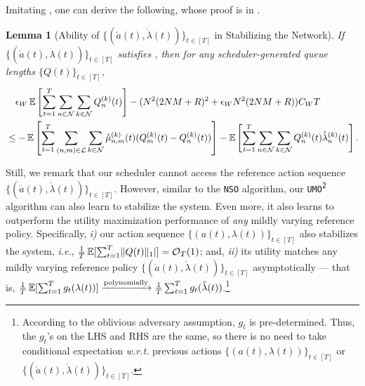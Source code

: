 \documentclass[11pt,fullpage,letterpaper]{article} %
\newtheorem{lemma}[theorem]{Lemma}
\renewcommand{\bm}[1]{#1}%
\renewcommand{\O}{\operatorname{\mathcal O}}
\newcommand{\E}{\operatornamewithlimits{\mathbb{E}}}
\newcommand{\mN}{{\mathcal N}}
\newcommand{\mL}{{\mathcal L}}
\newcommand{\SSAlg}{\texttt{NSO}\xspace}
\newcommand{\UMAlg}{\texttt{UMO}\textsuperscript{\texttt{2}}\xspace}
\begin{document}
Imitating , one can derive the following, whose proof is in .
\begin{lemma}[Ability of $\{(\mathring{\bm a}(t),\mathring{\bm \lambda}(t))\}_{t\in [T]}$ in Stabilizing the Network]\label{lem:multi-hop utility network stability}
If $\{(\mathring{\bm a}(t),\mathring{\bm \lambda}(t))\}_{t\in [T]}$ satisfies , then for any scheduler-generated queue lengths $\{\bm Q(t)\}_{t\in [T]}$,
\begin{align}
&\quad \epsilon_W \E\left [\sum_{t=1}^T \sum_{n\in \mN} \sum_{k\in \mN} Q_n^{(k)}(t)\right ] - (N^2 (2NM+R)^2 + \epsilon_W N^2 (2NM+R)) C_W T \nonumber\\
&\le-\E\left [\sum_{t=1}^T \sum_{(n,m)\in \mL}\sum_{k\in \mN} \mathring \mu_{n,m}^{(k)}(t) (Q_m^{(k)}(t) - Q_n^{(k)}(t))\right ] - \E\left [\sum_{t=1}^T \sum_{n\in \mN} \sum_{k\in \mN} Q_n^{(k)}(t) \mathring \lambda_n^{(k)}(t)\right ].\label{eq:multi-hop utility network stability}
\end{align}
\end{lemma}

Still, we remark that our scheduler cannot access the reference action sequence $\{(\mathring{\bm a}(t),\mathring{\bm \lambda}(t))\}_{t\in [T]}$. However, similar to the \SSAlg algorithm, our \UMAlg algorithm can also learn to stabilize the system.
Even more, it also learns to outperform the utility maximization performance of \textit{any} mildly varying reference policy.
Specifically, \textit{i)} our action sequence $\{(\bm a(t),\bm \lambda(t))\}_{t\in [T]}$ also stabilizes the system, \textit{i.e.}, $\frac 1T \E[\sum_{t=1}^T \lVert \bm Q(t)\rVert_1\rvert]=\O_T(1)$; and, \textit{ii)} its utility matches any mildly varying reference policy $\{(\mathring{\bm a}(t),\mathring{\bm \lambda}(t))\}_{t\in [T]}$ asymptotically --- that is, $\frac 1T \E[\sum_{t=1}^T g_t(\bm \lambda(t))]\xrightarrow{\text{polynomially}} \frac 1T \sum_{t=1}^T g_t(\mathring{\bm \lambda}(t))$.\footnote{According to the oblivious adversary assumption, $g_t$ is pre-determined. Thus, the $g_t$'s on the LHS and RHS are the same, so there is no need to take conditional expectation \textit{w.r.t.} previous actions $\{(\bm a(t),\bm \lambda(t))\}_{t\in [T]}$ or $\{(\mathring{\bm a}(t),\mathring{\bm \lambda}(t))\}_{t\in [T]}$.}
\end{document}
